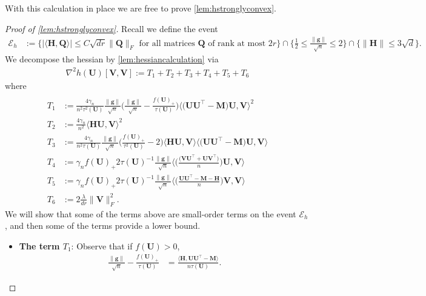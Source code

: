 \documentclass[10pt]{article}
\renewcommand{\t}{^{\top}}
\newcommand{\inv}{^{-1}}
\theoremstyle{definition}
\begin{document}
With this calculation in place we are free to prove \cref{lem:hstronglyconvex}.

\begin{proof}[Proof of \cref{lem:hstronglyconvex}]
Recall we define the event
\begin{align}
    \mathcal{E}_h &:= \bigg\{ \big| \langle \bm{H}, \bm{Q} \rangle \big| \leq C \sqrt{dr} \| \bm{Q} \|_F \text{ for all matrices $\bm{Q}$ of rank at most $2r$} \bigg\} \cap \big\{ \frac{1}{2} \leq  \frac{\|\bm{g}\|}{\sqrt{n}} \leq 2 \big\} \cap \bigg\{ \| \bm{H} \| \leq 3 \sqrt{d} \bigg\}.
\end{align}
We decompose the hessian by \cref{lem:hessiancalculation} via
\begin{align}
    \nabla^2 h(\bm{U})[\bm{V}, \bm{V}] := T_1 + T_2 + T_3 + T_4 + T_5 + T_6
\end{align}
where
\begin{align}
 \\   T_1 &:= \frac{4 \gamma_n}{n^2 \tau^2(\bm{U})} \frac{\|\bm{g}\|}{\sqrt{n}} \bigg( \frac{\|\bm{g}\|}{\sqrt{n}} - \frac{f(\bm{U})_+}{\tau(\bm{U})} \bigg) \bigg \langle \big( \bm{UU}\t - \bm{M}\big) \bm{U}, \bm{V} \bigg \rangle^2\\  
 T_2 &:= \frac{4\gamma_n}{n^2} \bigg \langle \bm{HU}, \bm{V} \bigg\rangle^2 \\  
 T_3 &:= \frac{4 \gamma_n}{n^2 \tau(\bm{U})} \frac{\|\bm{g}\|}{\sqrt{n}} \bigg( \frac{f(\bm{U})_+}{\tau^2(\bm{U})} - 2 \bigg) \bigg \langle \bm{HU}, \bm{V} \bigg \rangle \bigg \langle \big( \bm{UU}\t - \bm{M} \big) \bm{U}, \bm{V} \bigg \rangle \\
 T_4 &:= \gamma_n f(\bm{U})_+ 2\tau(\bm{U})\inv \frac{\|\bm{g}\|}{\sqrt{n}}  \bigg\langle \bigg(  \frac{\big(  \bm{VU}\t +  \bm{UV}\t \big) }{n}  \bigg)\bm{U}, \bm{V} \bigg \rangle \\   
 T_5 &:= \gamma_n f(\bm{U})_+ 2\tau(\bm{U})\inv \frac{\|\bm{g}\|}{\sqrt{n}}  \bigg\langle \bigg(  \frac{\bm{UU}\t - \bm{M}- \bm{H}}{n}  \bigg) \bm{V} , \bm{V} \bigg \rangle \\   
 T_6 &:=  2 \frac{\lambda}{dr} \| \bm{V} \|_F^2.
\end{align}
We will show that some of the terms above are small-order terms on the event $\mathcal{E}_h$, and then some of the terms provide a lower bound.
\begin{itemize}
    \item \textbf{The term $T_1$}:  Observe that if $f(\bm{U}) > 0$,
\begin{align}
    \frac{\|\bm{g}\|}{\sqrt{n}} - \frac{f(\bm{U})_+}{\tau(\bm{U})} &= \frac{\langle \bm{H}, \bm{UU}\t - \bm{M} \rangle}{n \tau(\bm{U})}.

\end{align}
\end{itemize}
\end{proof}
\end{document}
